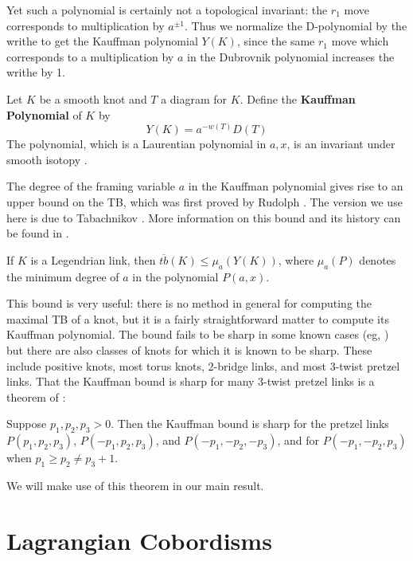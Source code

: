Yet such a polynomial is certainly not a topological invariant: the $r_1$ move corresponds to multiplication by $a^{\pm 1}$. Thus we normalize the D-polynomial by the writhe to get the Kauffman polynomial $Y(K)$, since the same $r_1$ move which corresponds to a multiplication by $a$ in the Dubrovnik polynomial increases the writhe by 1.
\begin{defn}
    Let $K$ be a smooth knot and $T$ a diagram for $K$. Define the \textbf{Kauffman Polynomial} of $K$ by
    \[
        Y(K) = a^{-w(T)} D(T)
    \]
    The polynomial, which is a Laurentian polynomial in $a, x$, is an invariant under smooth isotopy \cite{kauffman}.
\end{defn}

The degree of the framing variable $a$ in the Kauffman polynomial gives rise to an upper bound on the TB, which was first proved by Rudolph \cite{rudolph}. The version we use here is due to Tabachnikov \cite{tabachnikov}. More information on this bound and its history can be found in \cite{ferrand}.

\begin{theorem}\label{kauffman-bound}
    If $K$ is a Legendrian link, then $\overline{tb}(K) \leq \mu_a(Y(K))$, where $\mu_a(P)$ denotes the minimum degree of $a$ in the polynomial $P(a, x)$.
\end{theorem}

This bound is very useful: there is no method in general for computing the maximal TB of a knot, but it is a fairly straightforward matter to compute its Kauffman polynomial. The bound fails to be sharp in some known cases (eg, \cite{ferrand}) but there are also classes of knots for which it is known to be sharp. These include positive knots, most torus knots, 2-bridge links, and most 3-twist pretzel links. That the Kauffman bound is sharp for many 3-twist pretzel links is a theorem of \cite{ng}:

\begin{theorem}
    Suppose $p_1, p_2, p_3 > 0$. Then the Kauffman bound is sharp for the pretzel links $P(p_1, p_2, p_3)$, $P(-p_1, p_2, p_3)$, and $P(-p_1, -p_2, -p_3)$, and for $P(-p_1, -p_2, p_3)$ when $p_1 \geq p_2 \neq p_3 + 1$.
\end{theorem}

We will make use of this theorem in our main result.

\section{Lagrangian Cobordisms}

